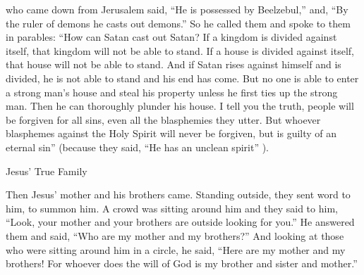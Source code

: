 {who came down
from
Jerusalem
said,
“He is possessed
by Beelzebul,”
and,
“By
the ruler
of demons
he casts out
demons.”
So
he called
them
and spoke
to them
in
parables: “How
can
Satan
cast out
Satan?
If
a kingdom
is divided
against
itself,
that
kingdom
will
not
be able
to stand.
If
a house
is divided
against
itself,
that
house
will
not
be able
to stand.
And
if
Satan
rises
against
himself
and
is divided,
he is
not
able
to stand
and
his end
has come.
But
no one
is able
to enter
a strong man’s
house
and steal
his
property
unless
he first
ties up
the strong man.
Then
he can thoroughly plunder
his
house.
I tell
you
the truth,
people will be forgiven
for all
sins,
even
all
the blasphemies
they utter.
But
whoever
blasphemes
against
the Holy
Spirit
will
never
be forgiven,
but
is
guilty
of an eternal
sin”
(because
they said,
“He has
an unclean
spirit” ).
\par }{\SH Jesus’ True Family
\par }{\PP {}Then
Jesus’
mother
and
his
brothers
came.
Standing
outside,
they sent word
to
him,
to summon
him.
A crowd
was sitting
around
him
and
they said
to him,
“Look,
your
mother
and
your
brothers
are
outside
looking for
you.”
He
answered
them
and said,
“Who
are
my
mother
and
my brothers?”
And
looking at
those who were sitting around
him
in a circle,
he said,
“Here are
my
mother
and
my
brothers!
For whoever
does
the will
of God
is
my
brother
and
sister
and
mother.”

}
